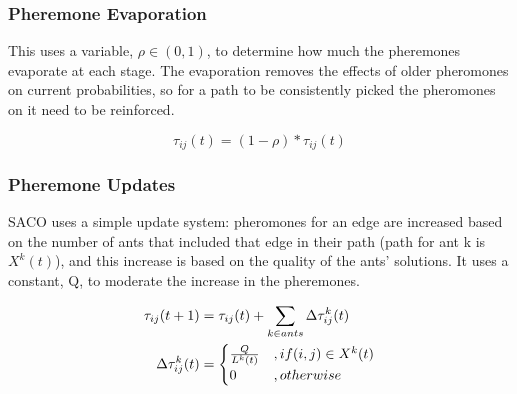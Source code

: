\subsubsection{Pheremone Evaporation}
This uses a variable, $\rho \in (0,1)$, to determine how much the pheremones evaporate at each stage. The evaporation removes the effects of older pheromones on current probabilities, so for a path to be consistently picked the pheromones on it need to be reinforced.

\begin{equation}
    \tau_{ij}(t) = (1-\rho) * \tau_{ij}(t)
\end{equation}

\subsubsection{Pheremone Updates}
SACO uses a simple update system: pheromones for an edge are increased based on the number of ants that included that edge in their path (path for ant k is $X^k(t)$), and this increase is based on the quality of the ants' solutions. It uses a constant, Q, to moderate the increase in the pheremones. 

\begin{align}
    \tau_{ij}(t+1) &= \tau_{ij}(t) + \sum_{k \in ants} \Delta \tau_{ij}^k(t) \\
    \Delta \tau_{ij}^k(t) &= 
    \begin{cases}
         $$ \frac{Q}{L^k(t)}  $$ &, if $$ (i,j) \in X^k(t) $$ \\ 
        0 &, otherwise
    \end{cases}    
\end{align}

